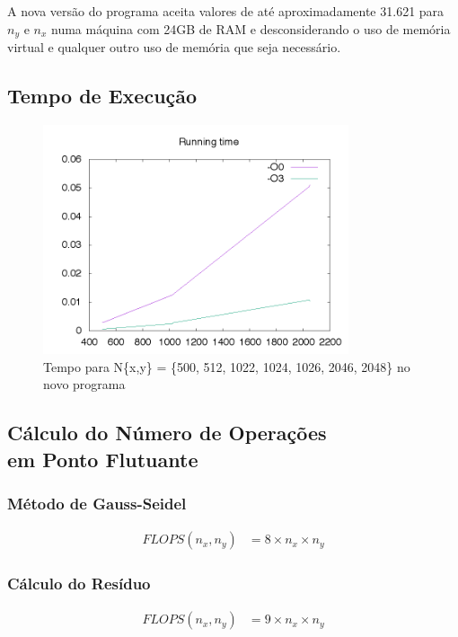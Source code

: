 \documentclass[12pt]{article}
\begin{document}
	A nova versão do programa aceita valores de até aproximadamente 31.621 para $n_y$ e $n_x$ numa máquina com 24GB de 	RAM e desconsiderando o uso de memória virtual e qualquer outro uso de memória que seja necessário.
	
	
	\subsection{Tempo de Execução}
	\begin{figure}[ht!]
		\centering
		\includegraphics[width=90mm]{newtime.png}
		\caption{Tempo para N\{x,y\} = \{500, 512, 1022, 1024, 1026, 2046, 2048\} no novo programa}
	\end{figure}


	\subsection{Cálculo do Número de Operações\\ em Ponto Flutuante}
		\subsubsection{Método de Gauss-Seidel}
		\begin{align*}
			FLOPS(n_x,n_y) &= 8\times n_x\times n_y
		\end{align*}
		\subsubsection{Cálculo do Resíduo}
		\begin{align*}
			FLOPS(n_x,n_y) &= 9\times n_x\times n_y
		\end{align*}
\end{document}
